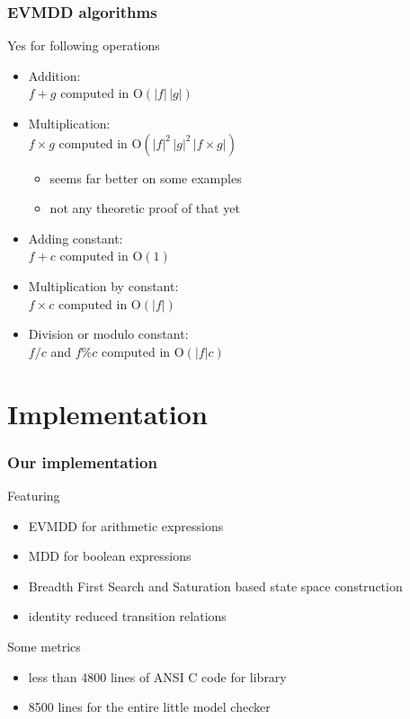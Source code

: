 \documentclass{beamer}
\renewcommand{\O}{\mathrm{O}}
\begin{document}
\begin{frame}
  \frametitle{EVMDD algorithms}
  Yes for following operations
  \begin{itemize}
  \item Addition:\\
    $f+g$ computed in $\O\left(|f|\,|g|\right)$
  \item Multiplication:\\
    $f\times g$ computed in $\O\left(|f|^2\,|g|^2\,|f\times g|\right)$
    \begin{itemize}
    \item seems far better on some examples
    \item not any theoretic proof of that yet
    \end{itemize}
  \item Adding constant:\\
    $f+c$ computed in $\O(1)$
  \item Multiplication by constant:\\
    $f\times c$ computed in $\O(|f|)$
  \item Division or modulo constant:\\
    $f/c$ and $f\%c$ computed in $\O(|f|c)$
  \end{itemize}
\end{frame}

\section{Implementation}

\begin{frame}
  \frametitle{Our implementation}
  Featuring
  \begin{itemize}
  \item EVMDD for arithmetic expressions
  \item MDD for boolean expressions
  \item Breadth First Search and Saturation based state space construction
  \item identity reduced transition relations
  \end{itemize}
  Some metrics
  \begin{itemize}
  \item less than 4800 lines of ANSI C code for library
  \item 8500 lines for the entire little model checker
  \end{itemize}
\end{frame}
\end{document}
